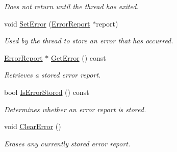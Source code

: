 \begin{DoxyCompactItemize}
\begin{DoxyCompactList}\small\item\em Does not return until the thread has exited. \item\end{DoxyCompactList}\item 
void \hyperlink{class_thread_single_ac26635ca1c9ec706788a90adbd877620}{SetError} (\hyperlink{class_error_report}{ErrorReport} $\ast$report)
\begin{DoxyCompactList}\small\item\em Used by the thread to store an error that has occurred. \item\end{DoxyCompactList}\item 
\hyperlink{class_error_report}{ErrorReport} $\ast$ \hyperlink{class_thread_single_ac2d65b11d96d80d449a500d1c323a9a1}{GetError} () const 
\begin{DoxyCompactList}\small\item\em Retrieves a stored error report. \item\end{DoxyCompactList}\item 
bool \hyperlink{class_thread_single_a89668c23ad9da603c109876ab9dab59f}{IsErrorStored} () const 
\begin{DoxyCompactList}\small\item\em Determines whether an error report is stored. \item\end{DoxyCompactList}\item 
\hypertarget{class_thread_single_a5628818cd67dfa6cfdcdffa8bb52a099}{
void \hyperlink{class_thread_single_a5628818cd67dfa6cfdcdffa8bb52a099}{ClearError} ()}
\label{class_thread_single_a5628818cd67dfa6cfdcdffa8bb52a099}

\begin{DoxyCompactList}\small\item\em Erases any currently stored error report. \item\end{DoxyCompactList}\end{DoxyCompactItemize}
